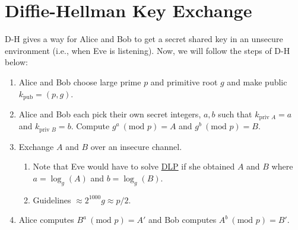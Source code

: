 
\renewcommand{\theenumi}{\arabic{enumi}}
\renewcommand{\labelenumi}{\theenumi.}
\section{Diffie-Hellman Key Exchange}
\label{sec:d-h key}

D-H gives a way for Alice and Bob to get a secret shared key in an unsecure environment (i.e., when Eve is listening). Now, we will follow the steps of D-H below:

\begin{enumerate}[label=\arabic*.]
    \item Alice and Bob choose large prime \(p\) and primitive root \(g\) and make public \(k_{\text{pub}} = (p,g)\).
    \item Alice and Bob each pick their own secret integers, \(a,b\) such that \(k_{\text{priv } A} = a\) and \(k_{\text{priv } B} = b\). Compute \(g^a \ (\text{mod } p) = A\) and \(g^b \ (\text{mod } p) = B\).
    \item Exchange \(A\) and \(B\) over an insecure channel.
          \begin{enumerate}[label=\roman*.]
              \item Note that Eve would have to solve \hyperref[Discrete Logarithm Problem]{DLP} if she obtained \(A\) and \(B\) where \(a = \log_g(A)\) and \(b = \log_g(B)\).
              \item Guidelines \(\approx 2^{1000} g \approx p/2\).
          \end{enumerate}
    \item Alice computes \(B^a \ (\text{mod } p) = A'\) and Bob computes \(A^b \ (\text{mod } p) = B'\).
\end{enumerate}


